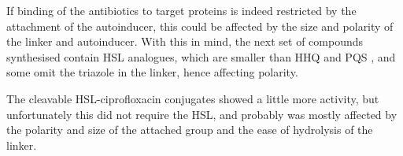 If binding of the antibiotics to target proteins is indeed restricted by the attachment of the autoinducer, this could be affected by the size and polarity of the linker and autoinducer. With this in mind, the next set of compounds synthesised contain HSL analogues, which are smaller than HHQ  and PQS , and some omit the triazole in the linker, hence affecting polarity.

The cleavable HSL-ciprofloxacin conjugates showed a little more activity, but unfortunately this did not require the HSL, and probably was mostly affected by the polarity and size of the attached group and the ease of hydrolysis of the linker.